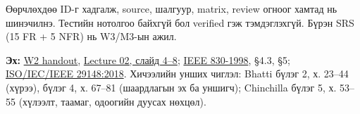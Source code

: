Өөрчлөхдөө ID-г хадгалж, source, шалгуур, matrix, review огноог хамтад
нь шинэчилнэ. Тестийн нотолгоо байхгүй бол verified гэж тэмдэглэхгүй.
Бүрэн SRS (15 FR + 5 NFR) нь W3/M3-ын ажил.

\textbf{Эх:}
\href{Software_Project_Documentation_Week_02_Handout.pdf}{W2 handout},
\href{../lecture/Lecture_02\%20Why\%20Documentation\%20Documentation\%20Standards.pdf}{Lecture
02, слайд 4--8};
\href{https://www.math.uaa.alaska.edu/~afkjm/cs401/IEEE830.pdf}{IEEE
830-1998}, §4.3, §5;
\href{https://standards.ieee.org/ieee/29148/6937/}{ISO/IEC/IEEE
29148:2018}. Хичээлийн унших чиглэл: Bhatti бүлэг 2, х. 23--44 (хүрээ),
бүлэг 4, х. 67--81 (шаардлагын эх ба уншигч); Chinchilla бүлэг 5, х.
53--55 (хүлээлт, таамаг, одоогийн дуусах нөхцөл).
